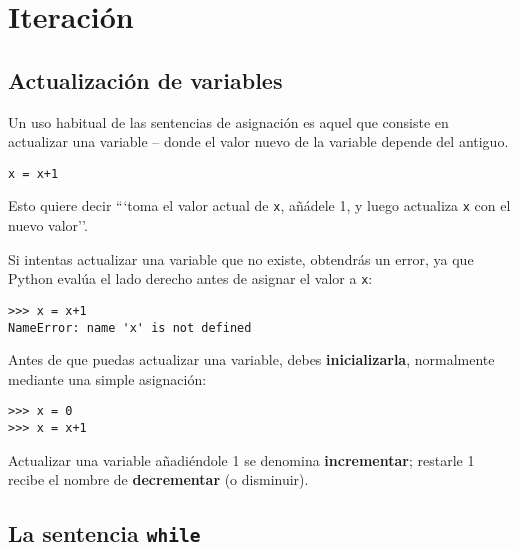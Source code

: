 
\chapter{Iteración}

\section{Actualización de variables}
\label{update}


Un uso habitual de las sentencias de asignación es aquel que consiste en
actualizar una variable --
donde el valor nuevo de la variable depende del antiguo.

\beforeverb
\begin{verbatim}
x = x+1
\end{verbatim}
\afterverb
%
Esto quiere decir ```toma el valor actual de {\tt x}, añádele 1, y luego
actualiza {\tt x} con el nuevo valor''.

Si intentas actualizar una variable que no existe, obtendrás
un error, ya que Python evalúa el lado derecho antes de asignar
el valor a {\tt x}:

\beforeverb
\begin{verbatim}
>>> x = x+1
NameError: name 'x' is not defined
\end{verbatim}
\afterverb
%
Antes de que puedas actualizar una variable, debes {\bf inicializarla},
normalmente mediante una simple asignación:


\beforeverb
\begin{verbatim}
>>> x = 0
>>> x = x+1
\end{verbatim}
\afterverb
%
Actualizar una variable añadiéndole 1 se denomina {\bf incrementar};
restarle 1 recibe el nombre de {\bf decrementar} (o disminuir).


\section{La sentencia {\tt while}}


